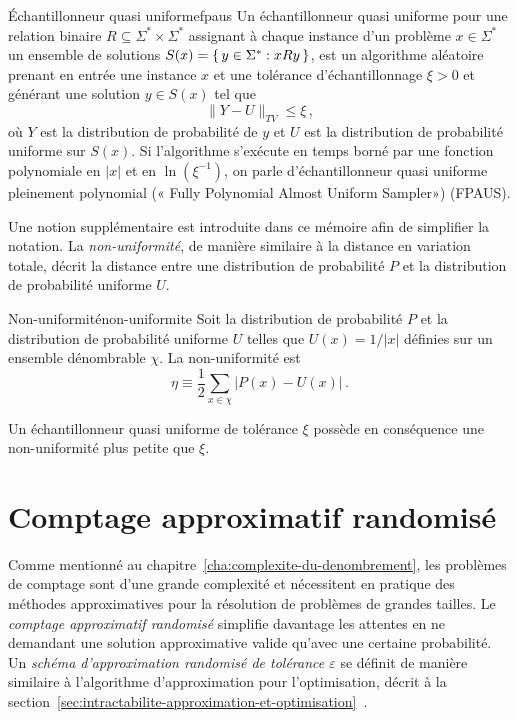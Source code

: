 \begin{maindefinition}{Échantillonneur quasi uniforme}{fpaus}
    Un échantillonneur quasi uniforme pour une relation binaire $R \subseteq \Sigma^{*} \times \Sigma^{*}$ assignant à chaque instance d'un problème $x \in \Sigma^{*}$ un ensemble de solutions $S(x) = \set{ y \in \Sigma^{*} : xRy }$, est un algorithme aléatoire prenant en entrée une instance $x$ et une tolérance d'échantillonnage $\xi > 0$ et générant une solution $y \in S(x)$ tel que
    \begin{equation*}
        \lVert Y - U \rVert_{TV} \leq \xi \,,
    \end{equation*}
    où $Y$ est la distribution de probabilité de $y$ et $U$ est la distribution de probabilité uniforme sur $S(x)$. Si l'algorithme s'exécute en temps borné par une fonction polynomiale en $\lvert x \rvert$ et en $\ln (\xi^{-1})$, on parle d'échantillonneur quasi uniforme pleinement polynomial (« Fully Polynomial Almost Uniform Sampler») (FPAUS).
\end{maindefinition}

 Une notion supplémentaire est introduite dans ce mémoire afin de simplifier la notation. La \textit{non-uniformité}, de manière similaire à la distance en variation totale, décrit la distance entre une distribution de probabilité $P$ et la distribution de probabilité uniforme $U$.

\begin{maindefinition}{Non-uniformité}{non-uniformite}
    Soit la distribution de probabilité $P$ et la distribution de probabilité uniforme $U$ telles que $U(x) = 1/\lvert x \rvert$ définies sur un ensemble dénombrable $\chi$. La non-uniformité est
    \begin{equation*}
        \eta \equiv \frac{1}{2} \sum_{x \in \chi} \lvert P(x) - U(x) \rvert \,. 
    \end{equation*}
\end{maindefinition}

Un échantillonneur quasi uniforme de tolérance $\xi$ possède en conséquence une non-uniformité plus petite que $\xi$.


\section{Comptage approximatif randomisé}
\label{sec:comptage-approximatif-randomise}

Comme mentionné au chapitre~\ref{cha:complexite-du-denombrement}, les problèmes de comptage sont d'une grande complexité et nécessitent en pratique des méthodes approximatives pour la résolution de problèmes de grandes tailles. Le \textit{comptage approximatif randomisé} simplifie davantage les attentes en ne demandant une solution approximative valide qu'avec une certaine probabilité. Un \textit{schéma d'approximation randomisé de tolérance $\varepsilon$} se définit de manière similaire à l'algorithme d'approximation pour l'optimisation, décrit à la section~\ref{sec:intractabilite-approximation-et-optimisation}~\cite{jerrumCountingSamplingIntegrating2003}. 

